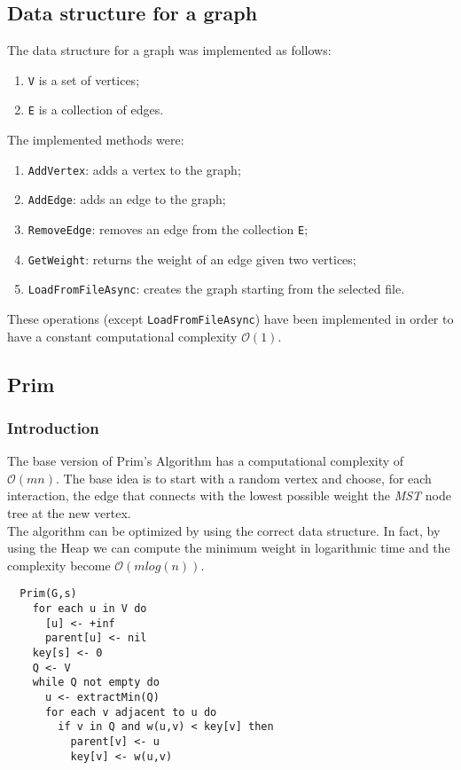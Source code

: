 \subsection*{Data structure for a graph}
The data structure for a graph was implemented as follows:
\begin{enumerate}
    \item \verb|V| is a set of vertices;
    \item \verb|E| is a collection of edges.
    \end{enumerate}
\noindent
The implemented methods were:
\begin{enumerate}
    \item \verb|AddVertex|: adds a vertex to the graph;
    \item \verb|AddEdge|: adds an edge to the graph;
    \item \verb|RemoveEdge|: removes an edge from the collection \verb|E|;
    \item \verb|GetWeight|: returns the weight of an edge given two vertices;
    \item \verb|LoadFromFileAsync|: creates the graph starting from the selected file.
\end{enumerate}
These operations (except \verb|LoadFromFileAsync|) have been implemented in order to have a constant computational complexity $\mathcal{O}(1)$.

\subsection{Prim}
\subsubsection{Introduction}
The base version of Prim's Algorithm has a computational complexity of $\mathcal{O}(mn)$.
The base idea is to start with a random vertex and choose, for each interaction, the edge 
that connects with the lowest possible weight the \textit{MST} node tree at the new vertex.\\
The algorithm can be optimized by using the correct data structure.
In fact, by using the Heap we can compute the minimum weight in logarithmic time and the complexity become $\mathcal{O}(mlog(n))$.

\begin{verbatim}
  Prim(G,s)
    for each u in V do
      [u] <- +inf
      parent[u] <- nil
    key[s] <- 0
    Q <- V
    while Q not empty do
      u <- extractMin(Q)
      for each v adjacent to u do
        if v in Q and w(u,v) < key[v] then
          parent[v] <- u
          key[v] <- w(u,v)
\end{verbatim}

